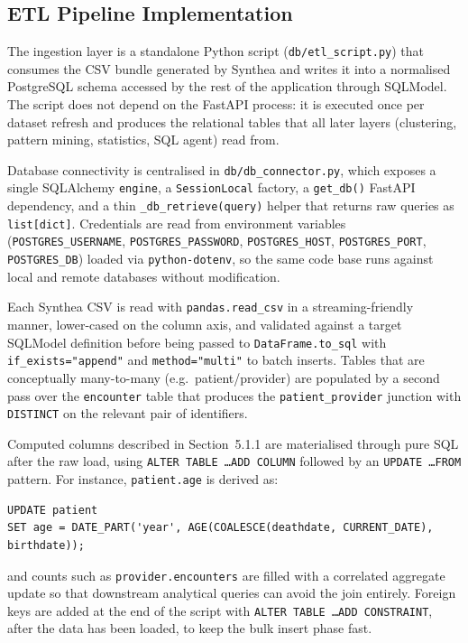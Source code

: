 \subsection{ETL Pipeline Implementation}

The ingestion layer is a standalone Python script (\texttt{db/etl\_script.py}) that consumes the CSV bundle generated by Synthea and writes it into a normalised PostgreSQL schema accessed by the rest of the application through SQLModel. The script does not depend on the FastAPI process: it is executed once per dataset refresh and produces the relational tables that all later layers (clustering, pattern mining, statistics, SQL agent) read from.

Database connectivity is centralised in \texttt{db/db\_connector.py}, which exposes a single SQLAlchemy \texttt{engine}, a \texttt{SessionLocal} factory, a \texttt{get\_db()} FastAPI dependency, and a thin \texttt{\_db\_retrieve(query)} helper that returns raw queries as \texttt{list[dict]}. Credentials are read from environment variables (\texttt{POSTGRES\_USERNAME}, \texttt{POSTGRES\_PASSWORD}, \texttt{POSTGRES\_HOST}, \texttt{POSTGRES\_PORT}, \texttt{POSTGRES\_DB}) loaded via \texttt{python-dotenv}, so the same code base runs against local and remote databases without modification.

Each Synthea CSV is read with \texttt{pandas.read\_csv} in a streaming-friendly manner, lower-cased on the column axis, and validated against a target SQLModel definition before being passed to \texttt{DataFrame.to\_sql} with \texttt{if\_exists="append"} and \texttt{method="multi"} to batch inserts. Tables that are conceptually many-to-many (e.g.\ patient/provider) are populated by a second pass over the \texttt{encounter} table that produces the \texttt{patient\_provider} junction with \texttt{DISTINCT} on the relevant pair of identifiers.

Computed columns described in Section~5.1.1 are materialised through pure SQL after the raw load, using \texttt{ALTER TABLE \dots ADD COLUMN} followed by an \texttt{UPDATE \dots FROM} pattern. For instance, \texttt{patient.age} is derived as:

\begin{verbatim}
UPDATE patient
SET age = DATE_PART('year', AGE(COALESCE(deathdate, CURRENT_DATE), birthdate));
\end{verbatim}

\noindent and counts such as \texttt{provider.encounters} are filled with a correlated aggregate update so that downstream analytical queries can avoid the join entirely. Foreign keys are added at the end of the script with \texttt{ALTER TABLE \dots ADD CONSTRAINT}, after the data has been loaded, to keep the bulk insert phase fast.

